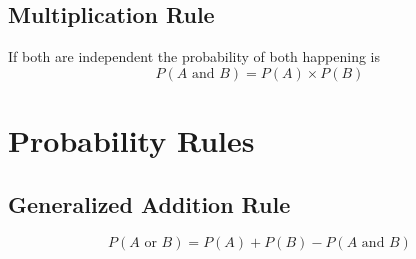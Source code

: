 \documentclass[12pt,a4paper]{article}
\begin{document}
\pagestyle{empty}
\def\rectangle{(0,0)--(0,4)--(4,4)--(4,0)--cycle}
\def\uncircle{(1,1) circle (1cm)}
\def\deuxcircle{(3,3) circle (1cm)}

\subsection*{Multiplication Rule}
If both are independent the probability of both happening is 
\begin{equation}
    P(A \text{ and } B)=P(A) \times P(B)
\end{equation}

\pagestyle{empty}
\def\rectangleun{(0,0)--(0,4)--(4,4)--(4,0)--cycle}
\def\circleun{(1,2) circle (1cm)}
\def\circledeux{(2,3) circle (1cm)}

\newpage
 \section*{Probability Rules}
 \subsection*{Generalized Addition Rule}
 \begin{equation}
 P(A \text{ or } B) = P(A) + P(B) - P(A \text{ and } B)
 \end{equation}

\pagestyle{empty}
\def\rectangleunun{(0,0)--(0,4)--(4,4)--(4,0)--cycle}
\def\circleunun{(1,2) circle (1cm)}
\def\circledeuxdeux{(2,3) circle (1cm)}
\end{document}
